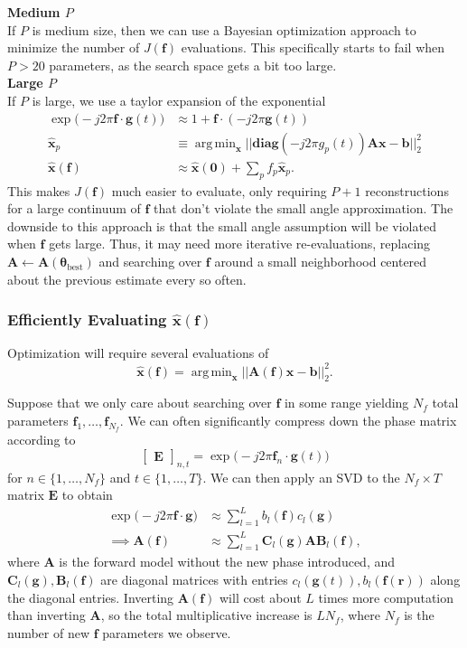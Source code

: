 \documentclass{article}
\DeclareMathOperator*{\argmin}{arg\,min}
\newcommand{\diag}{\textbf{diag}}
\newcommand{\x}{\mathbf{x}}
\renewcommand{\r}{\mathbf{r}}
\newcommand{\f}{\mathbf{f}}
\newcommand{\g}{\mathbf{g}}
\newcommand{\A}{\mathbf{A}}
\newcommand{\E}{\mathbf{E}}
\newcommand{\C}{\mathbf{C}}
\newcommand{\B}{\mathbf{B}}
\renewcommand{\b}{\mathbf{b}}
\newcommand{\params}{\boldsymbol{\theta}}
\begin{document}
\noindent \textbf{Medium $P$} \\
If $P$ is medium size, then we can use a Bayesian optimization approach to minimize the number of $J(\f)$ evaluations. This specifically starts to fail when $P > 20$ parameters, as the search space gets a bit too large. \\

\noindent \textbf{Large $P$} \\
If $P$ is large, we use a taylor expansion of the exponential 
\begin{align}
    \exp\big(-j2\pi \f \cdot \g(t) \big) &\approx 1 + \f \cdot (-j2\pi \g(t)) \\
    \hat{\x}_p &\equiv \argmin_\x ||\diag(-j2\pi g_p(t)) \A \x - \b||_2^2\\
    \hat{\x}(\f) &\approx \hat{\x}(\mathbf{0}) + \sum_p f_p \hat{\x}_p.
\end{align}
This makes $J(\f)$ much easier to evaluate, only requiring $P+1$ reconstructions for a large continuum of $\f$ that don't violate the small angle approximation. The downside to this approach is that the small angle assumption will be violated when $\f$ gets large. Thus, it may need more iterative re-evaluations, replacing $\A \gets \A(\params_\text{best})$ and searching over $\f$ around a small neighborhood centered about the previous estimate every so often.

\subsubsection{Efficiently Evaluating $\hat{\x}(\f)$}
Optimization will require several evaluations of 
\begin{equation}
    \hat{\x}(\f) = \argmin_{\x} ||\A(\f) \x - \b||_2^2.
\end{equation}

Suppose that we only care about searching over $\f$ in some range yielding $N_f$ total parameters $\f_1, \dots, \f_{N_f}$. We can often significantly compress down the phase matrix according to 
\begin{equation}
\begin{bmatrix} \E \end{bmatrix}_{n,t} = \exp\big( -j2\pi \f_n \cdot \g(t) \big) 
\end{equation}
for $n \in \{1, \dots, N_f\}$ and $t \in \{1, \dots, T\}$. We can then apply an SVD to the $N_f \times T$ matrix $\E$ to obtain 
\begin{align}
    \exp\big( -j2\pi \f \cdot \g \big) &\approx \sum_{l=1}^L b_l(\f) c_l(\g) \\
    \implies \A(\f) &\approx \sum_{l=1}^L \C_l(\g) \A \B_l(\f), 
\end{align}
where $\A$ is the forward model without the new phase introduced, and $\C_l(\g), \B_l(\f)$ are diagonal matrices with entries $c_l(\g(t)), b_l(\f(\r))$ along the diagonal entries. Inverting $\A(\f)$ will cost about $L$ times more computation than inverting $\A$, so the total multiplicative increase is $L N_f$, where $N_f$ is the number of new $\f$ parameters we observe.
\end{document}
